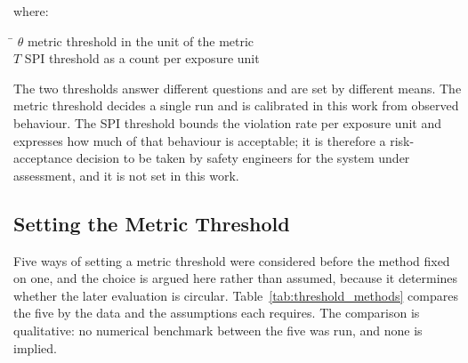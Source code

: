 where:\nopagebreak
\begin{tabbing}
    \hspace{2.2cm} \= \kill
    $\theta$ \> metric threshold in the unit of the metric \\
    $T$ \> SPI threshold as a count per exposure unit
\end{tabbing}

The two thresholds answer different questions and are set by different means.
The metric threshold decides a single run and is calibrated in this work from
observed behaviour. The SPI threshold bounds the violation rate per exposure unit
and expresses how much of that behaviour is acceptable; it is therefore a
risk-acceptance decision to be taken by safety engineers for the system under
assessment, and it is not set in this work.

\subsection{Setting the Metric Threshold}
\label{sec:method_metricthreshold}

Five ways of setting a metric threshold were considered before the method fixed
on one, and the choice is argued here rather than assumed, because it determines
whether the later evaluation is circular.
Table~\ref{tab:threshold_methods} compares the five by the data and the
assumptions each requires. The comparison is qualitative: no numerical benchmark
between the five was run, and none is implied.

